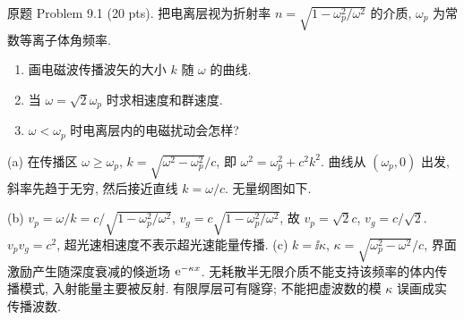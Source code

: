 \begin{exercise}\label{ps:9.1}
原题 Problem 9.1 (20 pts). 把电离层视为折射率 $n=\sqrt{1-\omega_p^2/\omega^2}$ 的介质, $\omega_p$ 为常数等离子体角频率.
\begin{enumerate}[label=\alph*.]
\item 画电磁波传播波矢的大小 $k$ 随 $\omega$ 的曲线.
\item 当 $\omega=\sqrt2\omega_p$ 时求相速度和群速度.
\item $\omega<\omega_p$ 时电离层内的电磁扰动会怎样?
\end{enumerate}
\end{exercise}
\begin{solution}
(a) 在传播区 $\omega\ge\omega_p$,
$k=\sqrt{\omega^2-\omega_p^2}/c$, 即 $\omega^2=\omega_p^2+c^2k^2$. 曲线从 $(\omega_p,0)$ 出发, 斜率先趋于无穷, 然后接近直线 $k=\omega/c$. 无量纲图如下.
\begin{center}\end{center}
(b) $v_p=\omega/k=c/\sqrt{1-\omega_p^2/\omega^2}$, $v_g=c\sqrt{1-\omega_p^2/\omega^2}$, 故 $v_p=\sqrt2c$, $v_g=c/\sqrt2$. $v_pv_g=c^2$, 超光速相速度不表示超光速能量传播.
(c) $k=\ii\kappa$, $\kappa=\sqrt{\omega_p^2-\omega^2}/c$, 界面激励产生随深度衰减的倏逝场 $\mathrm e^{-\kappa x}$. 无耗散半无限介质不能支持该频率的体内传播模式, 入射能量主要被反射. 有限厚层可有隧穿; 不能把虚波数的模 $\kappa$ 误画成实传播波数.
\end{solution}

